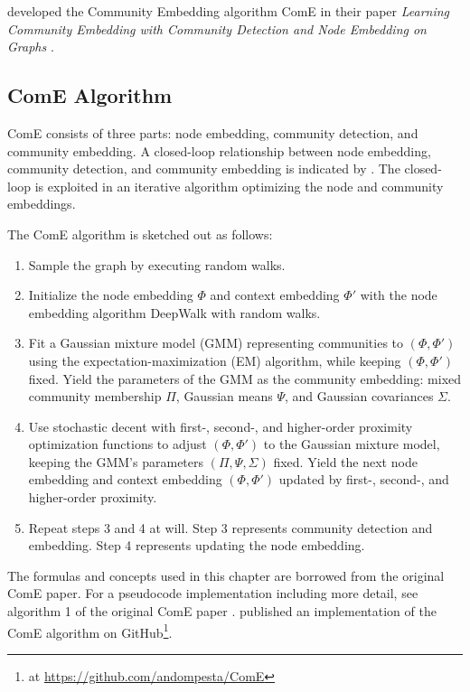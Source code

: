 \documentclass[conference]{IEEEtran}
\begin{document}
\citeauthor{ComE} developed the Community Embedding algorithm ComE in their \citeyear{ComE} paper \textit{Learning Community Embedding with Community Detection and Node Embedding on Graphs} \cite{ComE}.

\subsection{ComE Algorithm}
\label{sec:ComE_alg}

ComE consists of three parts: node embedding, community detection, and community embedding. A closed-loop relationship between node embedding, community detection, and community embedding is indicated by \citeauthor{ComE}. The closed-loop is exploited in an iterative algorithm optimizing the node and community embeddings.

The ComE algorithm is sketched out as follows:

\begin{enumerate}
    \item Sample the graph by executing random walks.
    \item Initialize the node embedding $\Phi$ and context embedding $\Phi'$ with the node embedding algorithm DeepWalk\cite{Perozzi2014DeepWalkOL} with random walks.
    \item Fit a Gaussian mixture model (GMM) representing communities to $(\Phi, \Phi')$ using the expectation-maximization (EM) algorithm, while keeping $(\Phi, \Phi')$ fixed. Yield the parameters of the GMM as the community embedding: mixed community membership $\Pi$, Gaussian means $\Psi$, and Gaussian covariances $\Sigma$.
    \item Use stochastic decent with first-, second-, and higher-order proximity optimization functions to adjust $(\Phi, \Phi')$ to the Gaussian mixture model, keeping the GMM's parameters $(\Pi, \Psi, \Sigma)$ fixed. Yield the next node embedding and context embedding $(\Phi, \Phi')$ updated by first-, second-, and higher-order proximity.
    \item Repeat steps 3 and 4 at will. Step 3 represents community detection and embedding. Step 4 represents updating the node embedding.
\end{enumerate}

The formulas and concepts used in this chapter are borrowed from the original ComE paper.\cite{ComE} For a pseudocode implementation including more detail, see algorithm 1 of the original ComE paper \cite{ComE}. \citeauthor{ComE_GH} published an implementation of the ComE algorithm on GitHub\footnote{at \url{https://github.com/andompesta/ComE}}.
\end{document}
